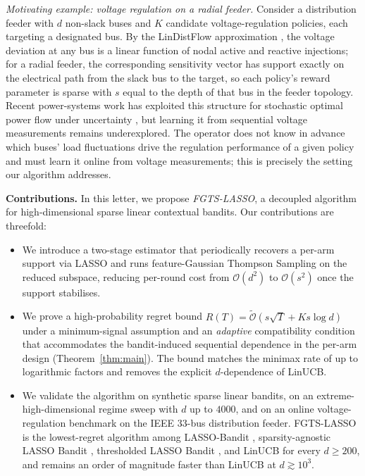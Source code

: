 \documentclass[10pt,journal,twoside,twocolumn]{IEEEtran}
\begin{document}
\textit{Motivating example: voltage regulation on a radial feeder.} Consider a distribution feeder with $d$ non-slack buses and $K$ candidate voltage-regulation policies, each targeting a designated bus. By the LinDistFlow approximation \cite{baran1989network}, the voltage deviation at any bus is a linear function of nodal active and reactive injections; for a radial feeder, the corresponding sensitivity vector has support exactly on the electrical path from the slack bus to the target, so each policy's reward parameter is sparse with $s$ equal to the depth of that bus in the feeder topology. Recent power-systems work has exploited this structure for stochastic optimal power flow under uncertainty \cite{lukashevich2023chance,lukashevich2024scenario}, but learning it from sequential voltage measurements remains underexplored. The operator does not know in advance which buses' load fluctuations drive the regulation performance of a given policy and must learn it online from voltage measurements; this is precisely the setting our algorithm addresses.

\textbf{Contributions.} In this letter, we propose \emph{FGTS-LASSO}, a decoupled algorithm for high-dimensional sparse linear contextual bandits. Our contributions are threefold:
\begin{itemize}
\item[(C1)] We introduce a two-stage estimator that periodically recovers a per-arm support via LASSO and runs feature-Gaussian Thompson Sampling \cite{agrawal2013thompson,abeille2017linear} on the reduced subspace, reducing per-round cost from $\mathcal{O}(d^2)$ to $\mathcal{O}(s^2)$ once the support stabilises.
\item[(C2)] We prove a high-probability regret bound $R(T) = \tilde{\mathcal{O}}(s\sqrt{T} + Ks\log d)$ under a minimum-signal assumption and an \emph{adaptive} compatibility condition that accommodates the bandit-induced sequential dependence in the per-arm design (Theorem~\ref{thm:main}). The bound matches the minimax rate of \cite{hao2020high} up to logarithmic factors and removes the explicit $d$-dependence of LinUCB.
\item[(C3)] We validate the algorithm on synthetic sparse linear bandits, on an extreme-high-dimensional regime sweep with $d$ up to $4000$, and on an online voltage-regulation benchmark on the IEEE 33-bus distribution feeder. FGTS-LASSO is the lowest-regret algorithm among LASSO-Bandit \cite{bastani2020online}, sparsity-agnostic LASSO Bandit \cite{oh2021sparsity}, thresholded LASSO Bandit \cite{ariu2022thresholded}, and LinUCB \cite{chu2011contextual} for every $d \geq 200$, and remains an order of magnitude faster than LinUCB at $d \gtrsim 10^3$.
\end{itemize}
\end{document}
